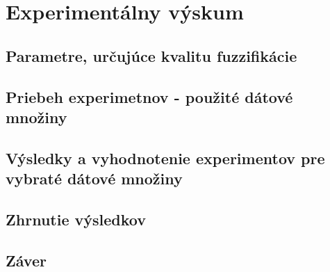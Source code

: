 \chapter{Experimentálny výskum} 

\section{Parametre, určujúce kvalitu fuzzifikácie}

\section{Priebeh experimetnov - použité dátové množiny}

\section{Výsledky a vyhodnotenie experimentov pre vybraté dátové množiny}

\section{Zhrnutie výsledkov }

\section{Záver}